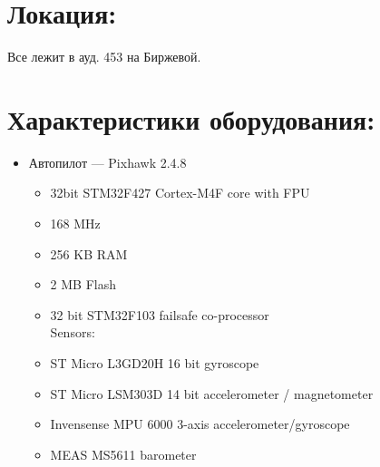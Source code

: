 \newpage

\section*{Локация:}

Все лежит в ауд. 453 на Биржевой. \\

\section*{Характеристики оборудования:}

\begin{itemize}
    \item Автопилот --- Pixhawk 2.4.8 \\
    \begin{itemize}
        Processor: 
        \item 32bit STM32F427 Cortex-M4F core with FPU
        \item 168 MHz
        \item 256 KB RAM
        \item 2 MB Flash
        \item 32 bit STM32F103 failsafe co-processor \\
        
        Sensors:
        \item ST Micro L3GD20H 16 bit gyroscope
        \item ST Micro LSM303D 14 bit accelerometer / magnetometer
        \item Invensense MPU 6000 3-axis accelerometer/gyroscope
        \item MEAS MS5611 barometer \\
        

\end{itemize}
\end{itemize}
